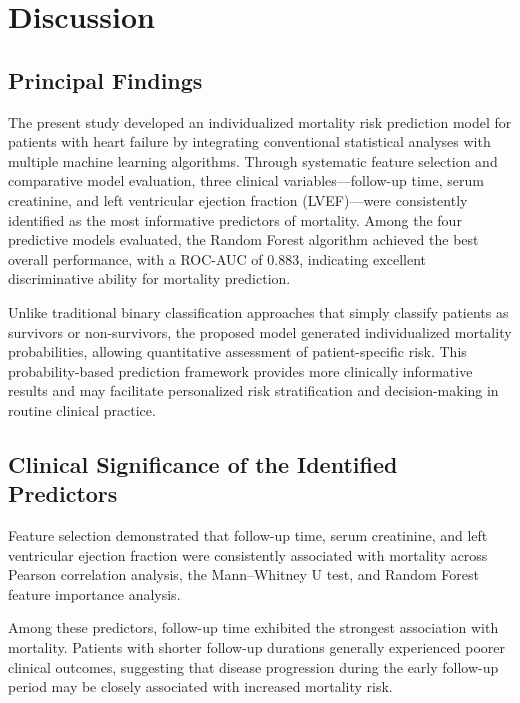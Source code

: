 \documentclass[12pt]{article}
\begin{document}
 

\section{Discussion}

\subsection{Principal Findings}

The present study developed an individualized mortality risk prediction model for patients with heart failure by integrating conventional statistical analyses with multiple machine learning algorithms. Through systematic feature selection and comparative model evaluation, three clinical variables—follow-up time, serum creatinine, and left ventricular ejection fraction (LVEF)—were consistently identified as the most informative predictors of mortality. Among the four predictive models evaluated, the Random Forest algorithm achieved the best overall performance, with a ROC-AUC of 0.883, indicating excellent discriminative ability for mortality prediction.

Unlike traditional binary classification approaches that simply classify patients as survivors or non-survivors, the proposed model generated individualized mortality probabilities, allowing quantitative assessment of patient-specific risk. This probability-based prediction framework provides more clinically informative results and may facilitate personalized risk stratification and decision-making in routine clinical practice. 

\subsection{Clinical Significance of the Identified Predictors}

Feature selection demonstrated that follow-up time, serum creatinine, and left ventricular ejection fraction were consistently associated with mortality across Pearson correlation analysis, the Mann–Whitney U test, and Random Forest feature importance analysis.\cite{McDonagh2021,Heidenreich2022,Pocock2013}

Among these predictors, follow-up time exhibited the strongest association with mortality. Patients with shorter follow-up durations generally experienced poorer clinical outcomes, suggesting that disease progression during the early follow-up period may be closely associated with increased mortality risk.\cite{Cox1972}
\end{document}
